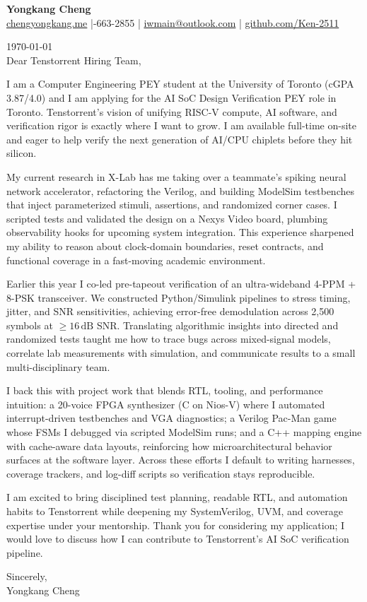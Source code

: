 \documentclass[11pt]{article}
\begin{document}
{\Large \textbf{Yongkang Cheng}}\\[2pt]
\href{https://chengyongkang.me/}{chengyongkang.me} \;|-663-2855 \;|\; \href{mailto:iwmain@outlook.com}{iwmain@outlook.com} \;|\; \href{https://github.com/Ken-2511}{github.com/Ken-2511}

\today\\[0.8em]

Dear Tenstorrent Hiring Team,

I am a Computer Engineering PEY student at the University of Toronto (cGPA 3.87/4.0) and I am applying for the AI SoC Design Verification PEY role in Toronto. Tenstorrent’s vision of unifying RISC-V compute, AI software, and verification rigor is exactly where I want to grow. I am available full-time on-site and eager to help verify the next generation of AI/CPU chiplets before they hit silicon.

My current research in X-Lab has me taking over a teammate’s spiking neural network accelerator, refactoring the Verilog, and building ModelSim testbenches that inject parameterized stimuli, assertions, and randomized corner cases. I scripted tests and validated the design on a Nexys Video board, plumbing observability hooks for upcoming system integration. This experience sharpened my ability to reason about clock-domain boundaries, reset contracts, and functional coverage in a fast-moving academic environment.

Earlier this year I co-led pre-tapeout verification of an ultra-wideband 4-PPM + 8-PSK transceiver. We constructed Python/Simulink pipelines to stress timing, jitter, and SNR sensitivities, achieving error-free demodulation across 2,500 symbols at $\geq 16\,\mathrm{dB}$ SNR. Translating algorithmic insights into directed and randomized tests taught me how to trace bugs across mixed-signal models, correlate lab measurements with simulation, and communicate results to a small multi-disciplinary team.

I back this with project work that blends RTL, tooling, and performance intuition: a 20-voice FPGA synthesizer (C on Nios-V) where I automated interrupt-driven testbenches and VGA diagnostics; a Verilog Pac-Man game whose FSMs I debugged via scripted ModelSim runs; and a C++ mapping engine with cache-aware data layouts, reinforcing how microarchitectural behavior surfaces at the software layer. Across these efforts I default to writing harnesses, coverage trackers, and log-diff scripts so verification stays reproducible.

I am excited to bring disciplined test planning, readable RTL, and automation habits to Tenstorrent while deepening my SystemVerilog, UVM, and coverage expertise under your mentorship. Thank you for considering my application; I would love to discuss how I can contribute to Tenstorrent’s AI SoC verification pipeline.

\vspace{1em}
Sincerely,\\[1.2em]
Yongkang Cheng
\end{document}
